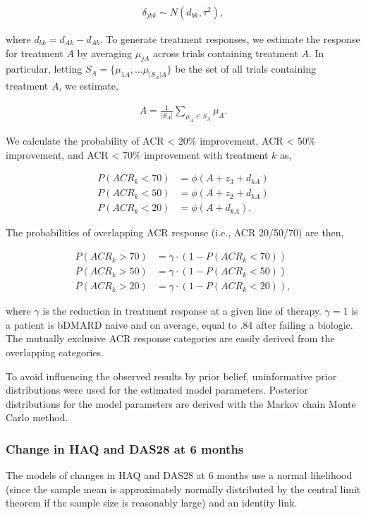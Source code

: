 \documentclass[11pt,final,fleqn]{article}\usepackage[]{graphicx}\usepackage[]{color}
\theoremstyle{plain}
\begin{document}
\begin{appendices}
\begin{align}
\delta_{jbk} \sim N(d_{bk}, \tau^2),
\end{align}

where $d_{bk} = d_{Ak} - d_{Ab}$. To generate treatment responses, we estimate the response for treatment $A$ by averaging $\mu_{jA}$ across trials containing treatment $A$. In particular, letting $S_A = \{\mu_{1A}, \ldots \mu_{|S_A|A}\}$ be the set of all trials containing treatment $A$, we estimate,

\begin{align} \label{eqn:NMA-A}
A = \frac{1}{|S_A|}\sum_{\mu_{A} \in S_A} \mu_{A}.
\end{align}

We calculate the probability of ACR < 20\% improvement, ACR < 50\% improvement, and ACR < 70\% improvement with treatment $k$ as,

\begin{align}
P(ACR_k < 70) &= \phi(A + z_3 + d_{kA}) \\
P(ACR_k < 50) &= \phi(A + z_2 + d_{kA}) \\
P(ACR_k < 20) &= \phi(A + d_{kA}).
\end{align}

The probabilities of overlapping ACR response (i.e., ACR 20/50/70) are then,

\begin{align} \label{eqn:ACR-overlap}
P(ACR_k > 70) &= \gamma \cdot (1 - P(ACR_k < 70))\\
P(ACR_k > 50) &= \gamma \cdot  (1 - P(ACR_k < 50)) \\
P(ACR_k > 20) &= \gamma \cdot (1 - P(ACR_k < 20)),
\end{align}

where $\gamma$ is the reduction in treatment response at a given line of therapy. $\gamma = 1$ is a patient is bDMARD naive and on average, equal to .84 after failing a biologic. The mutually exclusive ACR response categories are easily derived from the overlapping categories. 

To avoid influencing the observed results by prior belief, uninformative prior distributions were used for the estimated model parameters. Posterior distributions for the model parameters are derived with the Markov chain Monte Carlo method.

\subsubsection{Change in HAQ and DAS28 at 6 months}
The models of changes in HAQ and DAS28 at 6 months use a normal likelihood (since the sample mean is approximately normally distributed by the central limit theorem if the sample size is reasonably large) and an identity link. 


\end{appendices}
\end{document}
